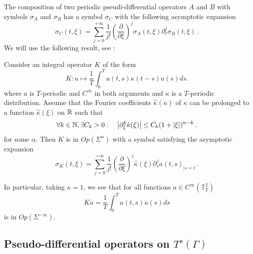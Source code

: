 \documentclass[a4paper]{article}
\begin{document}
The composition of two periodic pseudi-differential operators $A$ and $B$ with symbols $\sigma_A$ and $\sigma_B$ has a symbol $\sigma_C$ with the following asymptotic expansion
\begin{equation}
	\label{a_diese_b}
	\sigma_C(t,\xi) = \sum_{j = 0}^{+\infty}\frac{1}{j!} \left(\frac{\partial}{\partial \xi}\right)^j \sigma_A(t,\xi) \partial_t^j \sigma_B(t,\xi)\,.
\end{equation}
We will use the following result, see \cite{thrunen1998symbol}:
\begin{The}
	\label{thrunen}
	Consider an integral operator $K$ of the form 
	\[K : u \mapsto \frac{1}{T}\int_{0}^T a(t,s) \kappa(t-s) u(s) ds.\]
	where $a$ is $T$-periodic and $C^{\infty}$ in both arguments and $\kappa$ is a $T$-periodic distribution. Assume that the Fourier coefficients $\hat{\kappa}(n)$ of $\kappa$ can be prolonged to a function $\hat{\kappa}(\xi)$ on $\mathbb{R}$ such that
	\[\forall k \in \mathbb{N},  \exists C_k > 0: \quad \left\lvert \partial^k_\xi \hat{\kappa}(\xi) \right\rvert \leq C_k (1 + \left\lvert \xi \right\rvert)^{\alpha - k}\,.\]
	for some $\alpha$. Then $K$ is in $\textit{Op}(\Sigma^\alpha)$ with a symbol satisfying the asymptotic expansion
	\[\sigma_K(t, \xi) = \sum_{j = 0}^{+ \infty} \frac{1}{j!} \left(\frac{\partial}{\partial \xi}\right)^j \hat{\kappa}(\xi) \partial_s^ja(t,s)_{|s = t}\,.\]
\end{The}
\noindent In particular, taking $\kappa = 1$, we see that for all functions $a \in C^{\infty}(\mathbb{T}_T^2)$
\[Ku = \frac{1}{T}\int_{0}^{T} a(t,s) u(s) ds\]
is in $Op\left(\Sigma^{-\infty}\right)$.

\subsection{Pseudo-differential operators on $T^s(\Gamma)$}
\end{document}
